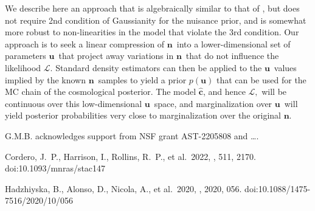 \documentclass[linenumbers, onecolumn]{aastex631}
\newcommand{\vecn}{\ensuremath{\mathbf{n}}}
\newcommand{\vecu}{\ensuremath{\mathbf{u}}}
\newcommand{\hatc}{\ensuremath{\hat{\mathbf{c}}}}
\newcommand{\likeli}{\mathcal{L}}
\begin{document}
We describe here an approach that is algebraically similar to that of \citet{hans}, but does not require 2nd condition of Gaussianity for the nuisance prior, and is somewhat more robust to non-linearities in the model that violate the 3rd condition.  Our approach is to seek a linear compression of \vecn\ into a lower-dimensional set of parameters \vecu\ that project away variations in \vecn\ that do not influence the likelihood $\likeli.$  Standard density estimators can then be applied to the \vecu\ values implied by the known \vecn\ samples to yield a prior $p(\vecu)$ that can be used for the MC chain of the cosmological posterior.  The model \hatc, and hence $\likeli,$ will be continuous over this low-dimensional \vecu\ space, and marginalization over \vecu\ will yield posterior probabilities very close to marginalization over the original \vecn.  

\begin{acknowledgments}

G.M.B. acknowledges support from NSF grant AST-2205808 and \ldots.

\end{acknowledgments}
% 

 Cordero, J.~P., Harrison, I., Rollins, R.~P., et al.\ 2022, \mnras, 511, 2170. doi:10.1093/mnras/stac147

 Hadzhiyska, B., Alonso, D., Nicola, A., et al.\ 2020, \jcap, 2020, 056. doi:10.1088/1475-7516/2020/10/056
\end{document}

